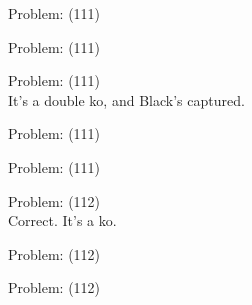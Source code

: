 \documentclass[11pt]{article}
\begin{document}
\begin{minipage}[t]{0.5\textwidth}
  {\centering
  
Problem: (111)\\
  }
\end{minipage}
\begin{minipage}[t]{0.5\textwidth}
  {\centering
  
Problem: (111)\\
  }
\end{minipage}
\begin{minipage}[t]{0.5\textwidth}
  {\centering
  
Problem: (111)\\
It's a double ko, and Black's captured.\\
  }
\end{minipage}
\begin{minipage}[t]{0.5\textwidth}
  {\centering
  
Problem: (111)\\
  }
\end{minipage}
\begin{minipage}[t]{0.5\textwidth}
  {\centering
  
Problem: (111)\\
  }
\end{minipage}
\begin{minipage}[t]{0.5\textwidth}
  {\centering
  
Problem: (112)\\
Correct. It's a ko.\\
  }
\end{minipage}
\begin{minipage}[t]{0.5\textwidth}
  {\centering
  
Problem: (112)\\
  }
\end{minipage}
\begin{minipage}[t]{0.5\textwidth}
  {\centering
  
Problem: (112)\\
  }
\end{minipage}
\end{document}
